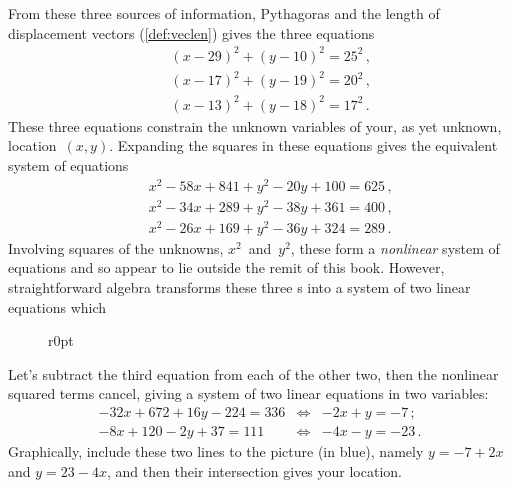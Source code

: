 \begin{example}
\begin{solution} 
From these three sources of information, Pythagoras and the length of displacement vectors (\cref{def:veclen}) gives the three equations
\begin{eqnarray*}
&&(x-29)^2+(y-10)^2=25^2\,,
\\&&(x-17)^2+(y-19)^2=20^2\,,
\\&&(x-13)^2+(y-18)^2=17^2\,.
\end{eqnarray*}
These three equations constrain the unknown variables of your, as yet unknown, location~\((x,y)\).
Expanding the squares in these equations gives the equivalent system of equations
\begin{eqnarray*}
&&x^2-58x+841+y^2-20y+100=625\,,
\\&&x^2-34x+289+y^2-38y+361=400\,,
\\&&x^2-26x+169+y^2-36y+324=289\,.
\end{eqnarray*}
Involving squares of the unknowns, \(x^2\)~and~\(y^2\), these form a \emph{nonlinear} system of equations and so appear to lie outside the remit of this book.  
However, straightforward algebra transforms these three s into a system of two linear equations which 

\begin{figure}r{0pt}
\end{figure}
Let's subtract the third equation from each of the other two, then the nonlinear squared terms cancel, giving a system of two linear equations in two variables:
\begin{eqnarray*}
-32x+672+16y-224=336&\iff&-2x+y=-7\,;
\\-8x+120-2y+37=111&\iff&-4x-y=-23\,.
\end{eqnarray*}%
Graphically, include these two lines to the picture (in blue), namely \(y=-7+2x\) and \(y=23-4x\), and then their intersection gives your location.


\end{solution}
\end{example}
